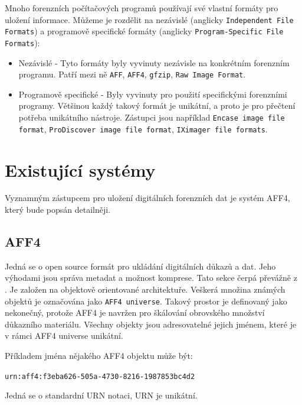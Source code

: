 Mnoho forenzních počítačových programů používají své vlastní formáty pro uložení informace. Můžeme je rozdělit na nezávislé (anglicky \texttt{Independent File Formats}) a programově specifické formáty (anglicky \texttt{Program-Specific File Formats}):

\begin{itemize}
\item Nezávislé - Tyto formáty byly vyvinuty nezávisle na konkrétním forenzním programu. Patří mezi ně \texttt{AFF}, \texttt{AFF4}, \texttt{gfzip}, \texttt{Raw Image Format}.

\item Programově specifické - Byly vyvinuty pro použití specifickými forenzními programy. Většinou každý takový formát je unikátní, a proto je pro přečtení potřeba unikátního nástroje.
Zástupci jsou například \texttt{Encase image file format}, \texttt{ProDiscover image file format}, \texttt{IXimager file formats}.
\end{itemize}

\section{Existující systémy}
Vyznamným zástupcem pro uložení digitálních forenzních dat je systém AFF4, který bude popsán detailněji.

\subsection{AFF4}
Jedná se o open source formát pro ukládání digitálních důkazů a dat. Jeho výhodami jsou správa metadat a možnost komprese. Tato sekce čerpá převážně z \cite{aff4}. Je založen na objektově orientované architektuře. Veškerá množina známých objektů je označována jako \texttt{AFF4 universe}. Takový prostor je definovaný jako nekonečný, protože AFF4 je navržen pro škálování obrovského množství důkazního materiálu. Všechny objekty jsou adresovatelné jejich jménem, které je v rámci AFF4 universe unikátní.

\vspace{0.5cm}

\noindent Příkladem jména nějakého AFF4 objektu může být:

\texttt{urn:aff4:f3eba626-505a-4730-8216-1987853bc4d2}

\noindent Jedná se o standardní URN notaci, URN je unikátní.

\vspace{0.5cm}

